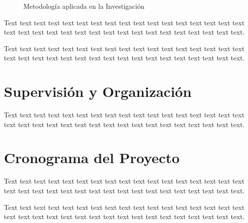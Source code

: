 \documentclass[12pt,a4paper]{article}
\begin{document}
\begin{figure}[ht!]
\caption{Metodología aplicada en la Investigación}
\label{fig2}
\end{figure}

Text text text text text text text text text text text  text text text text text text text text text text text text text text text text text text text text text text text.

Text text text text text text text text text text text  text text text text text text text text text text text text text text text text text text text text text text text.


\section{Supervisión y Organización}
Text text text text text text text text text text text  text text text text text text text text text text text text text text text text text text text text text text text.

\section{Cronograma del Proyecto}
Text text text text text text text text text text text  text text text text text text text text text text text text text text text text text text text text text text text.

Text text text text text text text text text text text  text text text text text text text text text text text text text text text text text text text text text text text.

\clearpage
\end{document}
